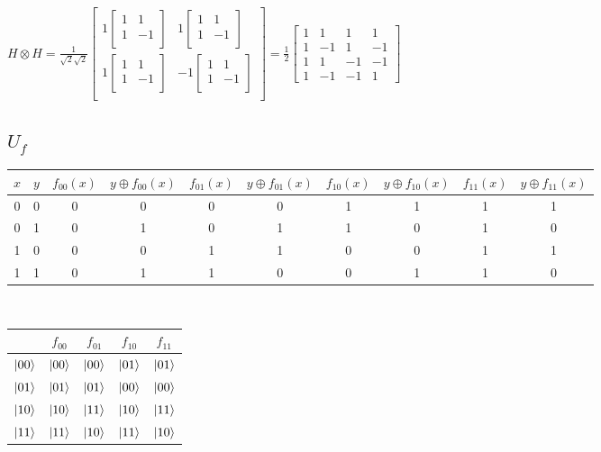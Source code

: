 \documentclass{iansnotes}
\begin{document}
$H \otimes H = \frac{1}{\sqrt{2}\sqrt{2}} \begin{bmatrix}
  1 \begin{bmatrix} 1 & 1 \\ 1 & -1 \\ \end{bmatrix} & 1 \begin{bmatrix} 1 & 1 \\ 1 & -1 \\ \end{bmatrix} \\[5mm]
  1 \begin{bmatrix} 1 & 1 \\ 1 & -1 \\ \end{bmatrix} & -1 \begin{bmatrix} 1 & 1 \\ 1 & -1 \\ \end{bmatrix} \\
\end{bmatrix} = \frac{1}{2} \begin{bmatrix} 1 & 1 & 1 & 1 \\ 1 & -1 & 1 & -1 \\ 1 & 1 & -1 & -1 \\ 1 & -1 & -1 & 1 \end{bmatrix}$



\subsection{$U_f$}

\begin{tabular}{cc|cc|cc|cc|cc}
  { \footnotesize $x$ } & { \footnotesize $y$ } & { \footnotesize $f_{00}(x)$ } & { \footnotesize $y \oplus f_{00}(x)$ } & { \footnotesize $f_{01}(x)$ }& { \footnotesize $y \oplus f_{01}(x)$ } & { \footnotesize $f_{10}(x)$ } & { \footnotesize $y \oplus f_{10}(x)$ } & { \footnotesize $f_{11}(x)$ } & { \footnotesize$y \oplus f_{11}(x)$ } \\
  \midrule
  0 & 0 & 0 & 0 & 0 & 0 & 1 & 1 & 1 & 1 \\
  0 & 1 & 0 & 1 & 0 & 1 & 1 & 0 & 1 & 0 \\
  1 & 0 & 0 & 0 & 1 & 1 & 0 & 0 & 1 & 1 \\
  1 & 1 & 0 & 1 & 1 & 0 & 0 & 1 & 1 & 0 \\
\end{tabular} \\[12mm]
\noindent \begin{tabular}{c|cccc}
           & $f_{00}$ & $f_{01}$ & $f_{10}$ & $f_{11}$ \\
  \midrule
  $\ket{00}$ & $\ket{00}$ & $\ket{00}$ & $\ket{01}$ & $\ket{01}$ \\
  $\ket{01}$ & $\ket{01}$ & $\ket{01}$ & $\ket{00}$ & $\ket{00}$ \\
  $\ket{10}$ & $\ket{10}$ & $\ket{11}$ & $\ket{10}$ & $\ket{11}$ \\
  $\ket{11}$ & $\ket{11}$ & $\ket{10}$ & $\ket{11}$ & $\ket{10}$ \\ 
\end{tabular}\\[16mm]
\end{document}
